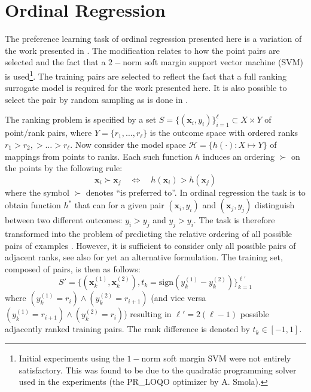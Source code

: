 \documentclass[10pt]{llncs}
\renewcommand{\vec}[1]{{\mbox{\boldmath$#1$}}}
\renewcommand{\vec}[1]{{\mathbf #1}}
\begin{document}
\section{Ordinal Regression}\label{sec:OR}

The preference learning task of ordinal regression presented
here is a variation of the work presented in
\cite{Herbrich00,joachims02}. The modification relates to how
the point pairs are selected and the fact that a $2-$norm soft
margin support vector machine (SVM) is used\footnote{Initial
  experiments using the $1-$norm soft margin SVM were not
  entirely satisfactory. This was found to be due to the
  quadratic programming solver used in the experiments (the
  PR\_LOQO optimizer by A. Smola).}. The training pairs are
selected to reflect the fact that a full ranking surrogate model
is required for the work presented here. It is also possible to
select the pair by random sampling as is done in \cite{Herbrich00}.

The ranking problem is specified by a set $S =
\{(\vec{x}_i,y_i)\}_{i=1}^\ell \subset X \times Y$ of point/rank
pairs, where $Y=\{r_1,\ldots,r_\ell\}$ is the outcome space with
ordered ranks $r_1> r_2,> \ldots > r_\ell$.   Now consider the model space
$\mathcal{H} = \{h(\cdot) : X \mapsto Y\}$ of mappings from points to
ranks. Each such function $h$ induces an ordering $\succ$ on the
points by the following rule:
\begin{equation}
\vec{x}_i \succ \vec{x}_j \quad \Leftrightarrow \quad
h(\vec{x}_i) > h(\vec{x}_j)
\end{equation}
where the symbol $\succ$ denotes ``is preferred to''.  In
ordinal regression the task is to obtain function $h^*$ that can
for a given pair $(\vec{x}_i,y_i)$ and $(\vec{x}_j,y_j)$
distinguish between two different outcomes: $y_i > y_j$ and $y_j
> y_i$. The task is therefore transformed into the problem of
predicting the relative ordering of all possible pairs of
examples \cite{Herbrich00,joachims02}.  However, it is
sufficient to consider only all possible pairs of adjacent
ranks, see also \cite{shawe-taylor04:book} for yet an
alternative formulation.  The training set, composed of pairs,
is then as follows:
$$S' = \big\{(\vec{x}_k^{(1)},
\vec{x}_k^{(2)}),t_k=\text{sign}(y_k^{(1)} -
y_k^{(2)})\big\}_{k=1}^{\ell'}$$
where $(y_k^{(1)} = r_i) \wedge
(y_k^{(2)} = r_{i+1})$ (and vice versa $(y_k^{(1)} = r_{i+1})
\wedge (y_k^{(2)} = r_{i})$) resulting in $\ell'=2(\ell-1)$
possible adjacently ranked training pairs. The rank difference
is denoted by $t_k\in[-1,1]$.
\end{document}
